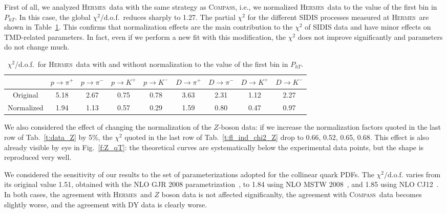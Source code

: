 \documentclass[aps,preprintnumbers,showpacs,nofootinbib,superscriptaddress,floatfix]{revtex4}
\newcommand{\hermes}{\textsc{Hermes}}
\newcommand{\compass}{\textsc{Compass}}
\begin{document}
First of all, we analyzed \hermes\ data with the same strategy as \compass,
i.e., we normalized \hermes\ data to the value of the first bin
in $P_{hT}$. In this case, the global
$\chi^2/$d.o.f.\ reduces sharply to 1.27. The partial $\chi^2$ for the
different SIDIS processes measured 
at \hermes\ are shown in Table~\ref{t:replica105-hermes}. 
This confirms that normalization effects are the main contribution to the
$\chi^2$ of SIDIS data and have minor effects on TMD-related parameters. In
fact, even if we perform a new fit with this modification, the $\chi^2$ does
not improve significantly and parameters do not change much.


\begin{table}[h!]
\begin{center}
\begin{tabular}{|c|c|c|c|c|c|c|c|c|}
 \hline
\hline
 ~     &  $p \to \pi^+$    &   $p \to \pi^-$    &  $p \to K^+$    &   $p \to K^-$       &  $D \to \pi^+$    &   $D \to \pi^-$    &  $D \to K^+$    &   $D \to K^-$                \\
\hline
 Original   &  5.18 &  2.67 & 0.75  & 0.78      &  3.63 &  2.31 & 1.12  & 2.27    \\
 \hline
Normalized  &  1.94 &  1.13 &  0.57 & 0.29 & 1.59  & 0.80 & 0.47 & 0.97  \\            
 \hline
 \hline
\end{tabular}
\caption{$\chi^2$/d.o.f.\ for \hermes\ data with and without normalization to the value of the first bin in $P_{hT}$.} 
\label{t:replica105-hermes}
\end{center}
\end{table}

We also considered the effect of changing the normalization of the $Z$-boson
data: if we increase the normalization factors quoted
in the last row of Tab.~\ref{t:data_Z} by 5\%, the $\chi^2$ quoted in the last
row of Tab.~\ref{t:fl_ind_chi2_Z}
drop to 0.66, 
0.52, 0.65, 0.68. This effect is
also already visible by eye in Fig.~\ref{f:Z_qT}: the theoretical curves are
systematically below the experimental data points, but the shape is reproduced
very well.

We considered the sensitivity of our results to the set of
parameterizations adopted for the collinear quark PDFs. 
The $\chi^2/ \text{d.o.f.}$ varies from its original value
1.51, obtained with the NLO GJR 2008 parametrization~\cite{Gluck:2007ck}, to
1.84 using NLO MSTW 2008~\cite{Martin:2009iq}, and 1.85 using NLO
CJ12~\cite{Owens:2012bv}. In both cases, the agreement with \hermes\
and $Z$ boson data is not affected significanlty,
 the agreement with \compass\ data becomes slightly worse, 
and the agreement with DY data is clearly worse. 
\end{document}
